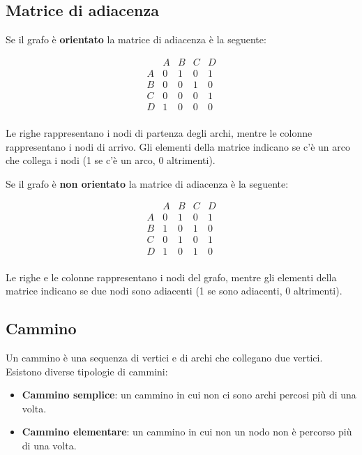 \subsection{Matrice di adiacenza}

Se il grafo \`e \textbf{orientato} la matrice di adiacenza \`e la seguente:

\begin{center}
  \[
\begin{array}{c|cccc}
  & A & B & C & D \\
\hline
A & 0 & 1 & 0 & 1 \\
B & 0 & 0 & 1 & 0 \\
C & 0 & 0 & 0 & 1 \\
D & 1 & 0 & 0 & 0 \\
\end{array}
\]
\end{center}
Le righe rappresentano i nodi di partenza degli archi, mentre le colonne rappresentano i nodi di arrivo. Gli elementi della matrice indicano se c'è un arco che collega i nodi (1 se c'è un arco, 0 altrimenti).



Se il grafo \`e \textbf{non orientato} la matrice di adiacenza \`e la seguente:

\begin{center}
  \[
\begin{array}{c|cccc}
  & A & B & C & D \\
\hline
A & 0 & 1 & 0 & 1 \\
B & 1 & 0 & 1 & 0 \\
C & 0 & 1 & 0 & 1 \\
D & 1 & 0 & 1 & 0 \\
\end{array}
\]
\end{center}
 Le righe e le colonne rappresentano i nodi del grafo, mentre gli elementi della matrice indicano se due nodi sono adiacenti (1 se sono adiacenti, 0 altrimenti).


 \subsection{Cammino}
 Un cammino \`e una sequenza di vertici e di archi che collegano due vertici.
 Esistono diverse tipologie di cammini:
 \begin{itemize}
   \item \textbf{Cammino semplice}: un cammino in cui non ci sono archi percosi pi\`u di una volta.
   \item \textbf{Cammino elementare}: un cammino in cui non un nodo non \`e percorso pi\`u di una volta.
 \end{itemize}

